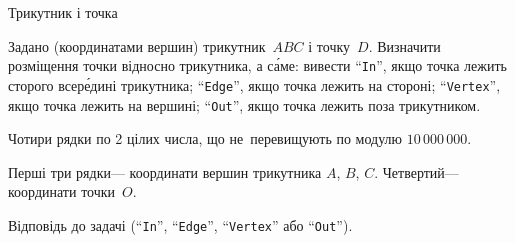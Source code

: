﻿\begin{problemAllDefault}{Трикутник і точка}

Задано (координатами вершин) трикутник~$ABC$ і точку~$D$. 
Визначити розміщення точки відносно трикутника, а с\'{а}ме:
вивести ``\texttt{In}'', якщо точка лежить сторого всер\'едині трикутника; 
``\texttt{Edge}'', якщо точка лежить на стороні; 
``\texttt{Vertex}'', якщо точка лежить на вершині; 
``\texttt{Out}'', якщо точка лежить поза трикутником.


\InputFile  Чотири рядки по 2 цілих числа, що не~перевищують по модулю $10\,000\,000$.

Перші три рядки\nolinebreak[3] --- координати вершин трикутника $A$, $B$, $C$. Четвертий\nolinebreak[3] --- координати точки~$O$.

\OutputFile  Відповідь до задачі (``\texttt{In}'', ``\texttt{Edge}'', ``\texttt{Vertex}'' або ``\texttt{Out}'').

\Example

\begin{example}
\end{example}

\end{problemAllDefault}
